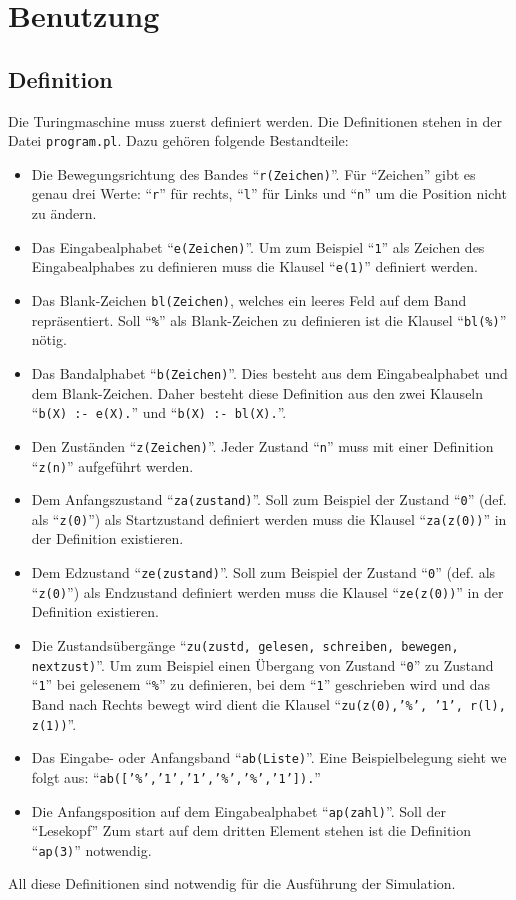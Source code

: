 \documentclass[final,a4paper,11pt,notitlepage,halfparskip]{scrreprt}
\begin{document}
\chapter{Benutzung}

\section{Definition}
Die Turingmaschine muss zuerst definiert werden. Die Definitionen stehen
in der Datei \texttt{program.pl}. Dazu gehören folgende Bestandteile:
\begin{itemize}
    \item Die Bewegungsrichtung des Bandes "`\texttt{r(Zeichen)}"'. Für
	"`Zeichen"' gibt es genau drei Werte: "`\texttt{r}"' für rechts,
	"`\texttt{l}"' für Links und "`\texttt{n}"' um die Position nicht 
	zu ändern.
    \item Das Eingabealphabet "`\texttt{e(Zeichen)}"'. Um zum Beispiel
	"`\texttt{1}"' als Zeichen des Eingabealphabes zu definieren
	muss die Klausel "`\texttt{e(1)}"' definiert werden.
    \item Das Blank-Zeichen \texttt{bl(Zeichen)}, welches ein leeres
	Feld auf dem Band repräsentiert. Soll "`\texttt{\%}"' als
	Blank-Zeichen zu definieren ist die Klausel "`\texttt{bl(\%)}"'
	nötig.	
    \item Das Bandalphabet "`\texttt{b(Zeichen)}"'. Dies besteht aus 
	dem Eingabealphabet und dem Blank-Zeichen. Daher besteht diese 
	Definition aus den zwei Klauseln "`\texttt{b(X) :- e(X).}"' 
	und "`\texttt{b(X) :- bl(X).}"'.
    \item Den Zuständen "`\texttt{z(Zeichen)}"'. Jeder Zustand
	"`\texttt{n}"' muss mit einer Definition "`\texttt{z(n)}"' 
	aufgeführt werden.	
    \item Dem Anfangszustand "`\texttt{za(zustand)}"'. Soll zum 
	Beispiel der Zustand "`\texttt{0}"' (def. als "`\texttt{z(0)}"') 
	als Startzustand definiert werden muss die Klausel
	"`\texttt{za(z(0))}"' in der Definition existieren.
    \item Dem Edzustand "`\texttt{ze(zustand)}"'. Soll zum 
	Beispiel der Zustand "`\texttt{0}"' (def. als "`\texttt{z(0)}"') 
	als Endzustand definiert werden muss die Klausel
	"`\texttt{ze(z(0))}"' in der Definition existieren.
    \item Die Zustandsübergänge 
	"`\texttt{zu(zustd, gelesen, schreiben, bewegen, nextzust)}"'.
	Um zum Beispiel einen Übergang von Zustand "`\texttt{0}"' zu
	Zustand "`\texttt{1}"' bei gelesenem "`\texttt{\%}"' zu
	definieren, bei dem "`\texttt{1}"' geschrieben wird und das Band
	nach Rechts bewegt wird dient die Klausel 
	"`\texttt{zu(z(0),'\%', '1',  r(l), z(1))}"'.
    \item Das Eingabe- oder Anfangsband "`\texttt{ab(Liste)}"'. Eine
	Beispielbelegung sieht we folgt aus:
	"`\texttt{ab(['\%','1','1','\%','\%','1']).}"'	
    \item Die Anfangsposition auf dem Eingabealphabet
	"`\texttt{ap(zahl)}"'. Soll der "`Lesekopf"' Zum start auf dem
	dritten Element stehen ist die Definition "`\texttt{ap(3)}"'
	notwendig.	
\end{itemize}
All diese Definitionen sind notwendig für die Ausführung der Simulation.
\end{document}
